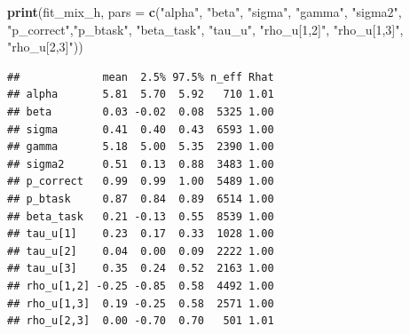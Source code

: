 \documentclass[12pt,]{krantz}
\newenvironment{Shaded}{\begin{snugshade}}{\end{snugshade}}
\newcommand{\DataTypeTok}[1]{\textcolor[rgb]{0.13,0.29,0.53}{#1}}
\newcommand{\KeywordTok}[1]{\textcolor[rgb]{0.13,0.29,0.53}{\textbf{#1}}}
\newcommand{\NormalTok}[1]{#1}
\newcommand{\OperatorTok}[1]{\textcolor[rgb]{0.81,0.36,0.00}{\textbf{#1}}}
\newcommand{\StringTok}[1]{\textcolor[rgb]{0.31,0.60,0.02}{#1}}
\theoremstyle{definition}
\theoremstyle{definition}
\theoremstyle{definition}
\theoremstyle{remark}
\begin{document}
\begin{Shaded}
\end{Shaded}

\begin{Shaded}
\begin{Highlighting}[]
\KeywordTok{print}\NormalTok{(fit_mix_h, }\DataTypeTok{pars =} \KeywordTok{c}\NormalTok{(}\StringTok{"alpha"}\NormalTok{, }\StringTok{"beta"}\NormalTok{, }\StringTok{"sigma"}\NormalTok{, }\StringTok{"gamma"}\NormalTok{, }\StringTok{"sigma2"}\NormalTok{,}
                          \StringTok{"p_correct"}\NormalTok{,}\StringTok{"p_btask"}\NormalTok{, }\StringTok{"beta_task"}\NormalTok{, }\StringTok{"tau_u"}\NormalTok{,}
                          \StringTok{"rho_u[1,2]"}\NormalTok{, }\StringTok{"rho_u[1,3]"}\NormalTok{, }\StringTok{"rho_u[2,3]"}\NormalTok{))}
\end{Highlighting}
\end{Shaded}

\begin{verbatim}
##             mean  2.5% 97.5% n_eff Rhat
## alpha       5.81  5.70  5.92   710 1.01
## beta        0.03 -0.02  0.08  5325 1.00
## sigma       0.41  0.40  0.43  6593 1.00
## gamma       5.18  5.00  5.35  2390 1.00
## sigma2      0.51  0.13  0.88  3483 1.00
## p_correct   0.99  0.99  1.00  5489 1.00
## p_btask     0.87  0.84  0.89  6514 1.00
## beta_task   0.21 -0.13  0.55  8539 1.00
## tau_u[1]    0.23  0.17  0.33  1028 1.00
## tau_u[2]    0.04  0.00  0.09  2222 1.00
## tau_u[3]    0.35  0.24  0.52  2163 1.00
## rho_u[1,2] -0.25 -0.85  0.58  4492 1.00
## rho_u[1,3]  0.19 -0.25  0.58  2571 1.00
## rho_u[2,3]  0.00 -0.70  0.70   501 1.01
\end{verbatim}
\end{document}
